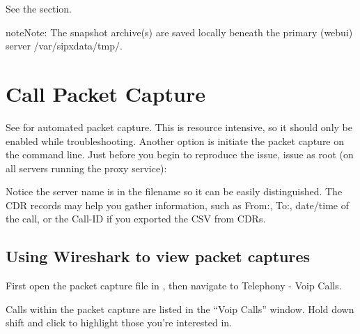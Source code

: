 \documentclass[letterpaper,10pt,english]{sphinxmanual}
\begin{document}
See the {\hyperref[\detokenize{webui:diagnostics-snapshot}]{}} section.

\begin{sphinxadmonition}{note}{Note:}
The snapshot archive(s) are saved locally beneath the primary (webui) server /var/sipxdata/tmp/.
\end{sphinxadmonition}


\section{Call Packet Capture}
\label{\detokenize{troubleshooting:call-packet-capture}}
See {\hyperref[\detokenize{webui:utility-services}]{}} for automated packet capture. This is resource intensive, so it should only be enabled while troubleshooting.
Another option is initiate the packet capture on the command line. Just before you begin to reproduce the issue, issue as root (on all servers running the proxy service):

\begin{sphinxVerbatim}[commandchars=\\\{\}]
      
\end{sphinxVerbatim}

Notice the server name is in the filename so it can be easily distinguished. The CDR records may help you gather information, such as From:, To:, date/time of the call, or the Call-ID if you exported the CSV from CDRs.


\subsection{Using Wireshark to view packet captures}
\label{\detokenize{troubleshooting:using-wireshark-to-view-packet-captures}}
First open the packet capture file in , then navigate to Telephony - Voip Calls.


Calls within the packet capture are listed in the “Voip Calls” window. Hold down shift and click to highlight those you’re interested in.
\end{document}
